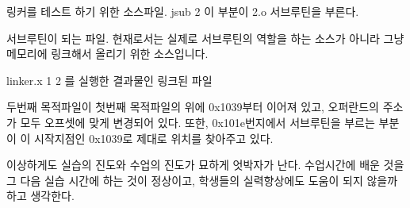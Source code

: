 \documentclass[12pt,a4paper]{article}
\begin{document}
\begin{enumerate}




링커를 테스트 하기 위한 소스파일. jsub 2 이 부분이 2.o 서브루틴을 부른다.



서브루틴이 되는 파일. 현재로서는 실제로 서브루틴의 역할을 하는 소스가 아니라 그냥 메모리에 링크해서 올리기 위한 소스입니다.



linker.x 1 2 를 실행한 결과물인 링크된 파일

두번째 목적파일이 첫번째 목적파일의 위에 0x1039부터 이어져 있고, 오퍼란드의 주소가 모두 오프셋에 맞게 변경되어 있다. 
또한, 0x101e번지에서 서브루틴을 부르는 부분이 이 시작지점인 0x1039로 제대로 위치를 찾아주고 있다.
\end{enumerate}

{}
\indent
이상하게도 실습의 진도와 수업의 진도가 묘하게 엇박자가 난다. 수업시간에 배운 것을 그 다음 실습 시간에 하는 것이 정상이고, 학생들의 실력향상에도 도움이 되지 않을까 하고 생각한다.
\end{document}
